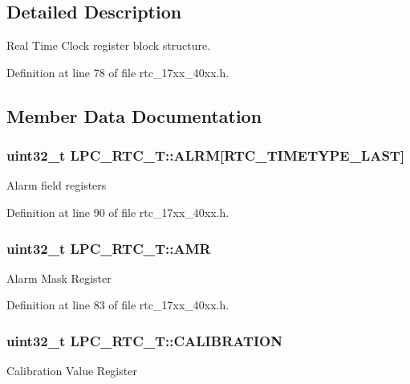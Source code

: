 \subsection{Detailed Description}
Real Time Clock register block structure. 

Definition at line 78 of file rtc\+\_\+17xx\+\_\+40xx.\+h.



\subsection{Member Data Documentation}
\subsubsection[{\texorpdfstring{A\+L\+RM}{ALRM}}]{ uint32\+\_\+t L\+P\+C\+\_\+\+R\+T\+C\+\_\+\+T\+::\+A\+L\+RM\mbox{[}{\bf R\+T\+C\+\_\+\+T\+I\+M\+E\+T\+Y\+P\+E\+\_\+\+L\+A\+ST}\mbox{]}}\hypertarget{structLPC__RTC__T_abeb0bd5d52ee9f40f515b9b007c7a832}{}\label{structLPC__RTC__T_abeb0bd5d52ee9f40f515b9b007c7a832}
Alarm field registers 

Definition at line 90 of file rtc\+\_\+17xx\+\_\+40xx.\+h.

\subsubsection[{\texorpdfstring{A\+MR}{AMR}}]{ uint32\+\_\+t L\+P\+C\+\_\+\+R\+T\+C\+\_\+\+T\+::\+A\+MR}\hypertarget{structLPC__RTC__T_af8b21ae5aa8bedcb0a1dd918678ee389}{}\label{structLPC__RTC__T_af8b21ae5aa8bedcb0a1dd918678ee389}
Alarm Mask Register 

Definition at line 83 of file rtc\+\_\+17xx\+\_\+40xx.\+h.

\subsubsection[{\texorpdfstring{C\+A\+L\+I\+B\+R\+A\+T\+I\+ON}{CALIBRATION}}]{ uint32\+\_\+t L\+P\+C\+\_\+\+R\+T\+C\+\_\+\+T\+::\+C\+A\+L\+I\+B\+R\+A\+T\+I\+ON}\hypertarget{structLPC__RTC__T_ade5b98ca9e6ea8af2fd91e8a4f20503b}{}\label{structLPC__RTC__T_ade5b98ca9e6ea8af2fd91e8a4f20503b}
Calibration Value Register 

